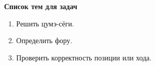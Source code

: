 \documentclass[12pt]{article}
\begin{document}
\bigbreak
\begin{center}\bfseries\large Список тем для задач\end{center}

\begin{enumerate}
\setlength{\parskip}{-0.3ex}\relax
\item Решить цумэ-сёги.
\item Определить фору.
\item Проверить корректность позиции или хода.
\end{enumerate}
\end{document}

